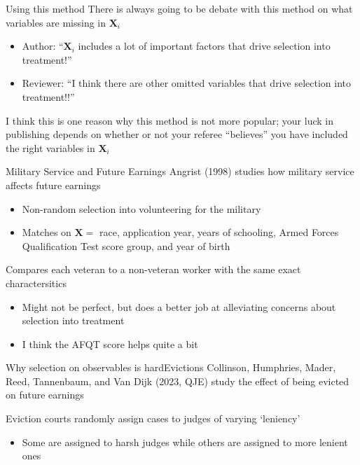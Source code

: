 \documentclass[aspectratio=169,t,11pt,table]{beamer}
\begin{document}

\begin{frame}{Using this method}
  There is always going to be debate with this method on what variables are missing in $\bm{X}_i$
  \begin{itemize}
    \item Author: ``$\bm{X}_i$ includes a lot of important factors that drive selection into treatment!''
    \item Reviewer: ``I think there are other omitted variables that drive selection into treatment!!''
  \end{itemize}

  \bigskip
  I think this is one reason why this method is not more popular; your luck in publishing depends on whether or not your referee ``believes'' you have included the right variables in $\bm{X}_i$
\end{frame}

\begin{frame}{Military Service and Future Earnings}
  Angrist (1998) studies how military service affects future earnings
  \begin{itemize}
    \item Non-random selection into volunteering for the military
    \item Matches on $\bm{X} = $ race, application year, years of schooling, Armed Forces Qualification Test score group, and year of birth
  \end{itemize}

  \bigskip
  Compares each veteran to a non-veteran worker with the same exact charactersitics
  \pause
  \begin{itemize}
    \item Might not be perfect, but does a better job at alleviating concerns about selection into treatment
    \item I think the AFQT score helps quite a bit
  \end{itemize}
\end{frame}

\begin{frame}{Why selection on observables is hard}{Evictions}
  Collinson, Humphries, Mader, Reed, Tannenbaum, and Van Dijk (2023, QJE) study the effect of being evicted on future earnings

  \bigskip
  Eviction courts randomly assign cases to judges of varying `leniency'
  \begin{itemize}
    \item Some are assigned to harsh judges while others are assigned to more lenient ones
  \end{itemize}
\end{frame}
\end{document}

